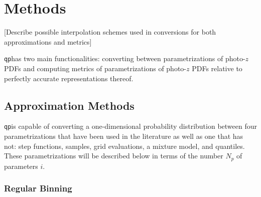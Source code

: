 \documentclass[\docopts]{\docclass}
\newcommand{\qp}{\texttt{qp}}
\begin{document}

\section{Methods}
\label{sec:methods}

[Describe possible interpolation schemes used in conversions for both approximations and metrics]

%
%
%

\qp has two main functionalities: converting between parametrizations of photo-$z$ PDFs and computing metrics of parametrizations of photo-$z$ PDFs relative to perfectly accurate representations thereof.

\subsection{Approximation Methods}
\label{sec:approx}


\qp is capable of converting a one-dimensional probability distribution between four parametrizations that have been used in the literature as well as one that has not: step functions, samples, grid evaluations, a mixture model, and quantiles.  These parametrizations will be described below in terms of the number $N_{p}$ of parameters $i$.


\subsubsection{Regular Binning}
\label{sec:bins}
\end{document}
